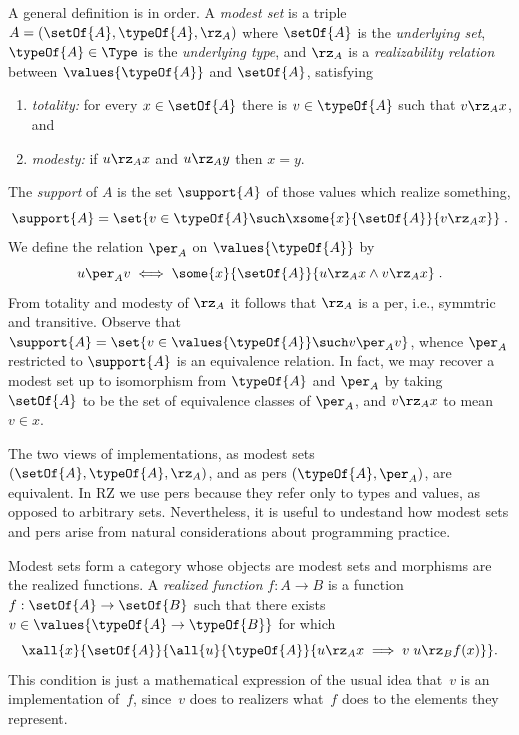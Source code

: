 A general definition is in order. A \emph{modest set} is a triple $A =
(\setOf{A}, \typeOf{A}, {\rz_A})$ where $\setOf{A}$ is the
\emph{underlying set}, $\typeOf{A} \in \Type$ is the \emph{underlying
  type}, and $\rz_A$ is a \emph{realizability relation} between
$\values{\typeOf{A}}$ and $\setOf{A}$, satisfying
% 
\begin{enumerate}
\item \emph{totality:} for every $x \in \setOf{A}$ there is $v \in
  \typeOf{A}$ such that $v \rz_A x$, and
\item \emph{modesty:} if $u \rz_A x$ and $u \rz_A y$ then $x = y$.
\end{enumerate}
%
The \emph{support} of $A$ is the set $\support{A}$ of those values
which realize something,
%
\begin{equation*}
  \support{A} = \set{v \in \typeOf{A} \such \xsome{x}{\setOf{A}}{v \rz_A x}} \;.
\end{equation*}
%
We define the relation $\per_A$ on $\values{\typeOf{A}}$ by
%
\begin{equation*}
  u \per_A v
  \iff
  \some{x}{\setOf{A}}{u \rz_A x \land v \rz_A x} \;.
\end{equation*}
%
From totality and modesty of $\rz_A$ it follows that $\rz_A$ is a per,
i.e., symmtric and transitive. Observe that $\support{A} = \set{v \in
  \values{\typeOf{A}} \such v \per_A v}$, whence $\per_A$
restricted to $\support{A}$ is an equivalence relation. In fact, we
may recover a modest set up to isomorphism from $\typeOf{A}$ and
$\per_A$ by taking $\setOf{A}$ to be the set of equivalence classes of
$\per_A$, and $v \rz_A x$ to mean $v \in x$.

The two views of implementations, as modest sets $(\setOf{A},
\typeOf{A}, {\rz_A})$, and as pers $(\typeOf{A}, {\per_A})$, are
equivalent. In RZ we use pers because they refer only to types and
values, as opposed to arbitrary sets. Nevertheless, it is useful to
undestand how modest sets and pers arise from natural considerations
about programming practice.

Modest sets form a category whose objects are modest sets and
morphisms are the realized functions. A \emph{realized function} $f :
A \to B$ is a function $f : \setOf{A} \to \setOf{B}$ such that there
exists $v \in \values{\typeOf{A} \to \typeOf{B}}$ for which
%
\begin{equation}
  \label{eq:rz-function-space}
  \xall{x}{\setOf{A}}{
    \all{u}{\typeOf{A}}{
      u \rz_A x \implies v\;u \rz_B f(x)
    }
  }.
\end{equation}
%
This condition is just a mathematical expression of the usual idea
that~$v$ is an implementation of~$f$, since~$v$ does to realizers
what~$f$ does to the elements they represent.

